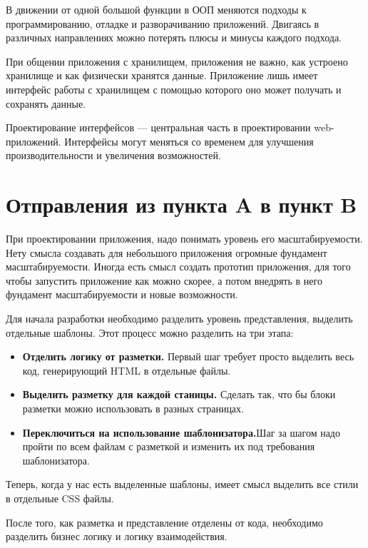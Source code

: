 В движении от одной большой функции в ООП меняются подходы к программированию, отладке и разворачиванию приложений. Двигаясь в различных направлениях можно потерять плюсы и минусы каждого подхода.

При общении приложения с хранилищем, приложения не важно, как устроено хранилище и как физически хранятся данные. Приложение лишь имеет интерфейс работы с хранилищем с помощью которого оно может получать и сохранять данные.


Проектирование интерфейсов --- центральная часть в проектировании web-приложений. Интерфейсы могут меняться со временем для улучшения производительности и увеличения возможностей. 

\section{ Отправления из пункта A в пункт B } \label{sect1_4}

При проектировании приложения, надо понимать уровень его масштабируемости. Нету смысла создавать для небольшого приложения огромные фундамент масштабируемости. Иногда есть смысл создать прототип приложения, для того чтобы запустить приложение как можно скорее, а потом внедрять в него фундамент масштабируемости и новые возможности.

Для начала разработки необходимо разделить уровень представления, выделить отдельные шаблоны. Этот процесс можно разделить на три этапа:
\begin{itemize}

\item \textbf{Отделить логику от разметки.} Первый шаг требует просто выделить весь код, генерирующий HTML в отдельные файлы.

\item \textbf{Выделить разметку для каждой станицы.} Сделать так, что бы блоки разметки можно использовать в разных страницах.

\item \textbf{Переключиться на использование шаблонизатора.}Шаг за шагом надо пройти по всем файлам с разметкой и изменить их под требования шаблонизатора.

\end{itemize}

Теперь, когда у нас есть выделенные шаблоны, имеет смысл выделить все стили в отдельные CSS файлы.


После того, как разметка и представление отделены от кода, необходимо разделить бизнес логику и логику взаимодействия.

